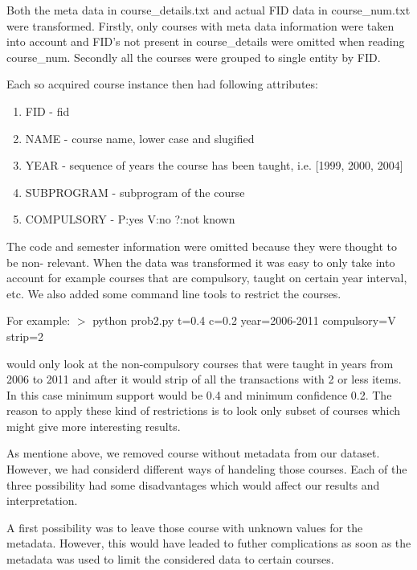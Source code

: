 Both the meta data in course\_details.txt and actual FID data in course\_num.txt were transformed.
Firstly, only courses with meta data information were taken into account and FID's not present in
course\_details were omitted when reading course\_num. Secondly all the courses were grouped 
to single entity by FID. 

Each so acquired course instance then had following attributes:
\begin{enumerate}
\item FID - fid
\item NAME - course name, lower case and slugified
\item YEAR - sequence of years the course has been taught, i.e. [1999, 2000, 2004]
\item SUBPROGRAM - subprogram of the course
\item COMPULSORY - P:yes V:no ?:not known
\end{enumerate}

The code and semester information were omitted because they were thought to be non- relevant.
When the data was transformed it was easy to only take into account for example courses that are
compulsory, taught on certain year interval, etc. We also added some command line tools to restrict the courses. 
\newline

For example:\newline
$>$ python prob2.py t=0.4 c=0.2 year=2006-2011 compulsory=V strip=2
\newline

would only look at the non-compulsory courses that were taught in years from 2006 to 2011 and 
after it would strip of all the transactions with 2 or less items.  In this case minimum support would be
0.4 and minimum confidence 0.2. The reason to apply these kind of restrictions is to look only 
subset of courses which might give more interesting results.
\newline


As mentione above, we removed course without metadata from our dataset. However, we had considerd different ways of handeling those courses.
Each of the three possibility had  some disadvantages which would affect our results and interpretation.


A first possibility was to leave those course with unknown values for the metadata. However, this would have leaded to 
futher complications as soon as the metadata was used to limit the considered data to certain courses. 


